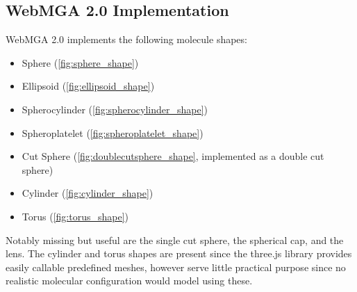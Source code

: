 \subsection{WebMGA 2.0 Implementation}
WebMGA 2.0 implements the following molecule shapes:
\begin{itemize}
  \item Sphere (\cref{fig:sphere_shape})
  \item Ellipsoid (\cref{fig:ellipsoid_shape})
  \item Spherocylinder (\cref{fig:spherocylinder_shape})
  \item Spheroplatelet (\cref{fig:spheroplatelet_shape})
  \item Cut Sphere (\cref{fig:doublecutsphere_shape}, implemented as a double cut sphere)
  \item Cylinder (\cref{fig:cylinder_shape})
  \item Torus (\cref{fig:torus_shape})
\end{itemize}
Notably missing but useful are the single cut sphere, the spherical cap, and the lens. The cylinder and torus shapes are present since the three.js library provides easily callable predefined meshes, however serve little practical purpose since no realistic molecular configuration would model using these.

